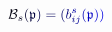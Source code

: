 \documentclass[12pt]{article}
\begin{document}
\makeatletter
\renewcommand*{\@textcolor}[3]{%
  \protect\leavevmode
  \begingroup
    \color#1{#2}#3%
  \endgroup
}
\makeatother
\begin{displaymath}
\mathcal { \mathcolor[RGB]{0,0,15}{B} } _ { \mathcolor[RGB]{0,0,30}{s} } \mathcolor[RGB]{0,0,45}{(} \mathfrak { \mathcolor[RGB]{0,0,60}{p} } \mathcolor[RGB]{0,0,75}{)} \mathcolor[RGB]{0,0,90}{=} \mathcolor[RGB]{0,0,105}{(} \mathcolor[RGB]{0,0,120}{b} _ { \mathcolor[RGB]{0,0,135}{i} \mathcolor[RGB]{0,0,150}{j} } ^ { \mathcolor[RGB]{0,0,165}{s} } \mathcolor[RGB]{0,0,180}{(} \mathfrak { \mathcolor[RGB]{0,0,195}{p} } \mathcolor[RGB]{0,0,210}{)} \mathcolor[RGB]{0,0,225}{)}
\end{displaymath}
\end{document}
